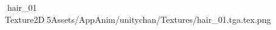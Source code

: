    hair_01             	   Texture2D   5   Assets/AppAnim/unitychan/Textures/hair_01.tga.tex.png